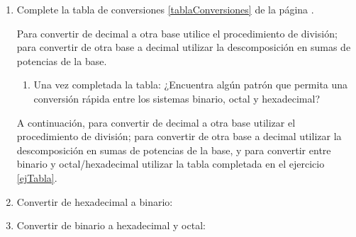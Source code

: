 \documentclass[12pt]{article}
\begin{document}
\begin{enumerate}

    \item Complete la tabla de conversiones \ref{tablaConversiones} de la
        página \pageref{tablaConversiones}. \label{ejTabla}

        Para convertir de decimal a otra base utilice el procedimiento de
        división; para convertir de otra base a decimal utilizar la
        descomposición en sumas de potencias de la base.

        \begin{enumerate}

            \item Una vez completada la tabla: ¿Encuentra algún patrón que
                permita una conversión rápida entre los sistemas binario,
                octal y hexadecimal?

        \end{enumerate}

        A continuación, para convertir de decimal a otra base utilizar el
        procedimiento de división; para convertir de otra base a decimal
        utilizar la descomposición en sumas de potencias de la base, y para
        convertir entre binario y octal/hexadecimal utilizar la tabla
        completada en el ejercicio \ref{ejTabla}.

    \item Convertir de hexadecimal a binario:


    \item Convertir de binario a hexadecimal y octal:

\end{enumerate}
\end{document}
